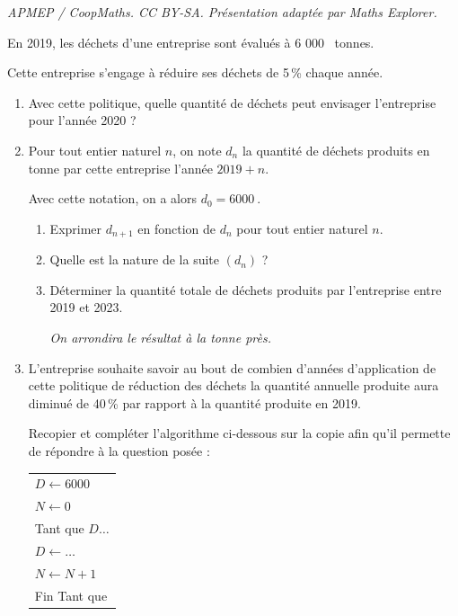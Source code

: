 \documentclass[10pt]{article}
\providecommand{\np}[2][]{{#2~#1}}
\providecommand{\dotfill}{\ldots}
\begin{document}
\noindent\textit{APMEP / CoopMaths. CC BY-SA. Présentation adaptée par Maths Explorer.}\par\medskip
\medskip

En 2019, les déchets d'une entreprise sont évalués à \np{6 000} tonnes.

Cette entreprise s'engage à réduire ses déchets de 5\,\% chaque année.

\medskip

\begin{enumerate}
\item  Avec cette politique, quelle quantité de déchets peut envisager l'entreprise pour l'année 2020 ?
\item Pour tout entier naturel $n$, on note $d_n$ la quantité de déchets produits en tonne par cette entreprise l'année $2019+n$.

Avec cette notation, on a alors $d_0 =\np{6000}$.
\begin{enumerate}
\item  Exprimer $d_{n+1}$ en fonction de $d_n$ pour tout entier naturel $n$.
\item Quelle est la nature de la suite $\left(d_n\right)$ ?
\item Déterminer la quantité totale de déchets produits par l'entreprise entre 2019 et 2023.

\emph{On arrondira le résultat à la tonne près.}
\end{enumerate}
\item L'entreprise souhaite savoir au bout de combien d'années d'application de cette politique de réduction des déchets la quantité annuelle produite aura diminué de 40\,\% par rapport à la quantité produite en 2019.

Recopier et compléter l'algorithme ci-dessous sur la copie afin qu'il permette de répondre à la question posée :

\begin{center}
\begin{tabular}[]{|m{4cm}|}
\hline
$D\longleftarrow \np{6000}$\\
 $N \longleftarrow 0$\\
Tant que $D \dotfill $ \\
\hspace{1.5em}$D \longleftarrow \dotfill $\\
\hspace{1.5em}$N\longleftarrow N+1$\\
Fin Tant que \\
\hline
\end{tabular}
\end{center}
\end{enumerate}

\vspace{0,5cm}
\end{document}
